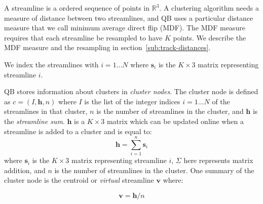 \documentclass{bioinfo}
\begin{document}
\begin{methods}
A streamline is a ordered sequence of points in $\mathbb{R}^{3}$.  A
clustering algorithm needs a measure of distance between two
streamlines, and QB uses a particular distance measure that we call
minimum average direct flip (MDF).  The MDF measure requires that each
streamline be resampled to have $K$ points. We describe the MDF measure
and the resampling in section~\ref{sub:track-distances}.

We index the streamlines with $i = 1 \dots N$ where $\mathbf{s}_{i}$ is
the $K\times3$ matrix representing streamline $i$.

QB stores information about clusters in \emph{cluster nodes}.  The
cluster node is defined as $c=(I,\mathbf{h},n)$ where $I$ is the list of
the integer indices $i = 1 \dots N$ of the streamlines in that cluster,
$n$ is the number of streamlines in the cluster, and $\mathbf{h}$ is the
\emph{streamline sum}. $\mathbf{h}$ is a $K \times3$ matrix which can be
updated online when a streamline is added to a cluster and is equal to:
\begin{equation}
  \mathbf{h}=\sum_{i=1}^{n}\mathbf{s}_{i}
\end{equation} 
where $\mathbf{s}_{i}$ is the $K\times3$ matrix representing streamline $i$,
$\Sigma$ here represents matrix addition, and $n$ is the number of
streamlines in the cluster. One summary of the cluster node is the centroid or
\emph{virtual} streamline $\mathbf{v}$ where:

\begin{equation}
  \mathbf{v} = \mathbf{h} / n
\end{equation}


\end{methods}
\end{document}
